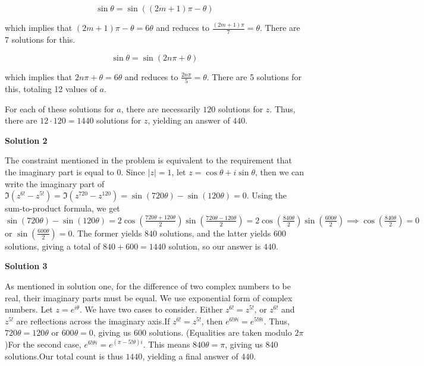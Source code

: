 \begin{enumerate}
 
 \[\sin \theta = \sin ((2m + 1)\pi - \theta)\]

 which implies that $(2m+1)\pi-\theta = 6\theta$ and reduces to $\frac{(2m + 1)\pi}{7} = \theta$. There are 7 solutions for this.

 
 \[\sin \theta = \sin (2n\pi + \theta)\]

 which implies that $2n\pi+\theta=6\theta$ and reduces to $\frac{2n\pi}{5} = \theta$. There are 5 solutions for this, totaling 12 values of $a$.

 For each of these solutions for $a$, there are necessarily $120$ solutions for $z$. Thus, there are $12\cdot 120=1440$ solutions for $z$, yielding an answer of $\boxed{440}$.

 



\textbf{Solution 2}

The constraint mentioned in the problem is equivalent to the requirement that the imaginary part is equal to $0$. Since $|z|=1$, let $z=\cos \theta + i\sin \theta$, then we can write the imaginary part of $\Im(z^{6!}-z^{5!})=\Im(z^{720}-z^{120})=\sin\left(720\theta\right)-\sin\left(120\theta\right)=0$. Using the sum-to-product formula, we get $\sin\left(720\theta\right)-\sin\left(120\theta\right)=2\cos\left(\frac{720\theta+120\theta}{2}\right)\sin\left(\frac{720\theta-120\theta}{2}\right)=2\cos\left(\frac{840\theta}{2}\right)\sin\left(\frac{600\theta}{2}\right)\implies \cos\left(\frac{840\theta}{2}\right)=0$ or $\sin\left(\frac{600\theta}{2}\right)=0$. The former yields $840$ solutions, and the latter yields $600$ solutions, giving a total of $840+600=1440$ solution, so our answer is $\boxed{440}$.

 



\textbf{Solution 3}

As mentioned in solution one, for the difference of two complex numbers to be real, their imaginary parts must be equal. We use exponential form of complex numbers. Let $z = e^{i \theta}$. We have two cases to consider. Either $z^{6!} = z^{5!}$, or $z^{6!}$ and $z^{5!}$ are reflections across the imaginary axis.If $z^{6!} = z^{5!}$, then $e^{6! \theta i} = e^{5! \theta i}$. Thus, $720 \theta = 120 \theta$ or $600\theta = 0$, giving us 600 solutions. (Equalities are taken modulo $2 \pi$)For the second case, $e^{6! \theta i} = e^{(\pi - 5!\theta)i}$. This means $840 \theta = \pi$, giving us 840 solutions.Our total count is thus $1440$, yielding a final answer of $\boxed{440}$.


\end{enumerate}
